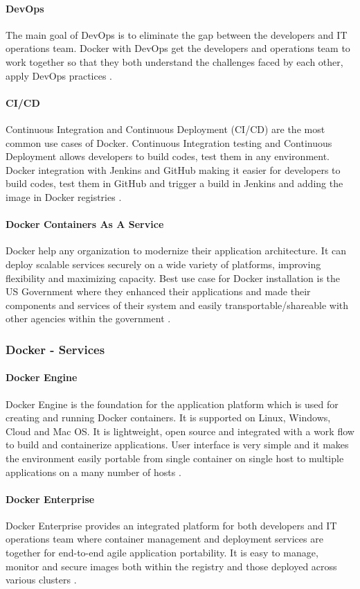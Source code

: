 \documentclass[sigconf]{acmart}
\begin{document}
	\paragraph{DevOps}
	The main goal of DevOps is to eliminate the gap between the developers and IT operations team. Docker with DevOps get the developers and operations team to work together so that they both understand the challenges faced by each other, apply DevOps practices \cite{hackernoon}.
	\paragraph{CI/CD}
	Continuous Integration and Continuous Deployment (CI/CD) are the most common use cases of Docker. Continuous Integration testing and Continuous Deployment allows developers to build codes, test them in any environment. Docker integration with Jenkins and GitHub making it easier for developers to build codes, test them in GitHub and trigger a build in Jenkins and adding the image in Docker registries \cite{hackernoon}.
	\paragraph{Docker Containers As A Service}
	Docker help any organization to  modernize their application architecture. It can deploy scalable services securely on a wide variety of platforms, improving flexibility and maximizing capacity. Best use case for Docker installation is the US Government where they enhanced their applications and made their components and services of their system and easily transportable/shareable with other agencies within the government \cite{hackernoon}.
	
	\subsubsection{Docker - Services}
	\paragraph{Docker Engine}
	Docker Engine is the foundation for the application platform which is used for creating and running Docker containers. It is supported on Linux, Windows, Cloud and Mac OS. It is lightweight, open source and integrated with a work flow to build and containerize applications. User interface is very simple and it makes the environment easily portable from single container on single host to multiple applications on a many number of hosts \cite{hackernoon}.
	\paragraph{Docker Enterprise}
	Docker Enterprise provides an integrated platform for both developers and IT operations team where container management and deployment services are together for end-to-end agile application portability. It is easy to manage, monitor and secure images both within the registry and those deployed across various clusters \cite{hackernoon}.
\end{document}
